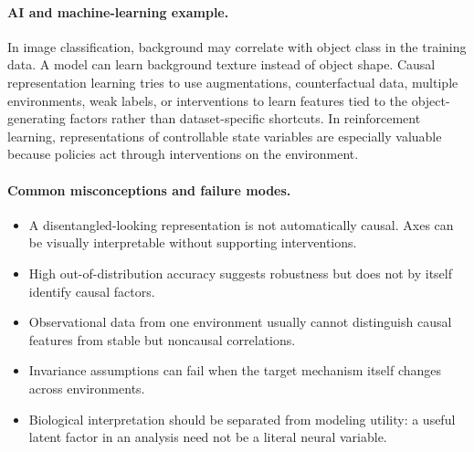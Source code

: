 \paragraph{AI and machine-learning example.}
In image classification, background may correlate with object class in the training data. A model can learn background texture instead of object shape. Causal representation learning tries to use augmentations, counterfactual data, multiple environments, weak labels, or interventions to learn features tied to the object-generating factors rather than dataset-specific shortcuts. In reinforcement learning, representations of controllable state variables are especially valuable because policies act through interventions on the environment.

\paragraph{Common misconceptions and failure modes.}
\begin{itemize}[leftmargin=*]
\item A disentangled-looking representation is not automatically causal. Axes can be visually interpretable without supporting interventions.
\item High out-of-distribution accuracy suggests robustness but does not by itself identify causal factors.
\item Observational data from one environment usually cannot distinguish causal features from stable but noncausal correlations.
\item Invariance assumptions can fail when the target mechanism itself changes across environments.
\item Biological interpretation should be separated from modeling utility: a useful latent factor in an analysis need not be a literal neural variable.
\end{itemize}


